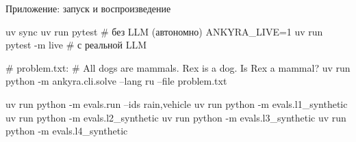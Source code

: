 \documentclass[aspectratio=169,11pt]{beamer}
\begin{document}
\begin{frame}[fragile]{Приложение: запуск и воспроизведение}
  \footnotesize
\begin{semiverbatim}
\scriptsize
uv sync
uv run pytest                       # без LLM (автономно)
ANKYRA_LIVE=1 uv run pytest -m live # с реальной LLM

# problem.txt:
# All dogs are mammals. Rex is a dog. Is Rex a mammal?
uv run python -m ankyra.cli.solve --lang ru --file problem.txt

uv run python -m evals.run --ids rain,vehicle
uv run python -m evals.l1_synthetic
uv run python -m evals.l2_synthetic
uv run python -m evals.l3_synthetic
uv run python -m evals.l4_synthetic
\end{semiverbatim}
\end{frame}
\end{document}
